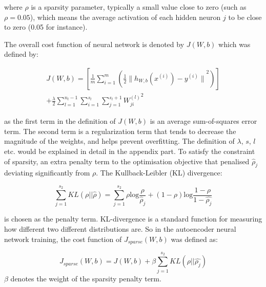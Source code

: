 \documentclass[journal]{IEEEtran}
\begin{document}
where $\rho$ is a sparsity parameter, typically a small value close to zero (such as $\rho = 0.05$), which means the average activation of each hidden neuron $j$ to be close to zero (0.05 for instance). 

The overall cost function of neural network is denoted by $J(W,b)$ which was defined by:

\begin{equation}
\begin{split}
J(W,b) = [\frac{1}{m}\sum_{i=1}^m(\frac{1}{2}{\|{h_{W,b}(x^{(i)})} - y^{(i)}\|}^2)] \\
+ \frac{\lambda}{2}\sum_{l=1}^{n_l-1} \sum_{i=1}^{s_l} \sum_{j=1}^{s_l+1}{W_{ji}^{(l)}}^2
\end{split}
\end{equation}

\noindent as the first term in the definition of $J(W,b)$ is an average sum-of-squares error term. The second term is a regularization term that tends to decrease the magnitude of the weights, and helps prevent overfitting. The definition of $\lambda$, $s$, $l$ etc. would be explained in detail in the appendix part. To satisfy the constraint of sparsity, an extra penalty term to the optimisation objective that penalised $\hat{\rho}_j $ deviating significantly from $\rho$. The Kullback-Leibler (KL) divergence:

\begin{equation}
 \sum_{j=1}^{s_2}KL(\rho||\hat{\rho}) =  \sum_{j=1}^{s_2}\rho \text{log}{\frac{\rho}{\hat{\rho}_j}}+(1-\rho)\text{log}\frac{1-\rho}{1-\hat{{\rho}_j}}
\end{equation}

\noindent is chosen as the  penalty term. KL-divergence is a standard function for measuring how different two different distributions are. So in the autoencoder neural network training, the cost function of $J_{sparse}(W,b)$ was defined as:

\begin{equation}
J_{sparse}(W,b) = J(W,b) + \beta \sum_{j=1}^{s_2}KL(\rho||\hat{\rho_j})
\end{equation}
\noindent $\beta$ denotes the weight of the sparsity penalty term.
\end{document}
